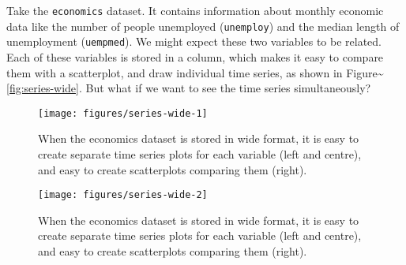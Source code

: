 Take the \texttt{economics} dataset. It contains information about
monthly economic data like the number of people unemployed
(\texttt{unemploy}) and the median length of unemployment
(\texttt{uempmed}). We might expect these two variables to be related.
Each of these variables is stored in a column, which makes it easy to
compare them with a scatterplot, and draw individual time series, as
shown in Figure\textasciitilde{}\ref{fig:series-wide}. But what if we
want to see the time series simultaneously?
 

\begin{Shaded}
\begin{Highlighting}[]
  \NormalTok{)}
\end{Highlighting}
\end{Shaded}

\begin{figure}
\texttt{[image: figures/series-wide-1]} \caption{When the economics dataset is stored in wide format, it is easy to create separate time series plots for each variable (left and centre), and easy to create scatterplots comparing them (right).\label{fig:series-wide1}}
\end{figure}

\begin{Shaded}
\begin{Highlighting}[]
  \NormalTok{)}
\end{Highlighting}
\end{Shaded}

\begin{figure}
\texttt{[image: figures/series-wide-2]} \caption{When the economics dataset is stored in wide format, it is easy to create separate time series plots for each variable (left and centre), and easy to create scatterplots comparing them (right).\label{fig:series-wide2}}
\end{figure}

\begin{Shaded}
\begin{Highlighting}[]
 \StringTok{ }\NormalTok{()}
\end{Highlighting}
\end{Shaded}

